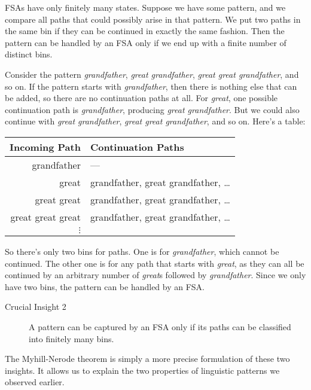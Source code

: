 FSAs have only finitely many states.
Suppose we have some pattern, and we compare all paths that could possibly arise in that pattern.
We put two paths in the same bin if they can be continued in exactly the same fashion.
Then the pattern can be handled by an FSA only if we end up with a finite number of distinct bins.
%
\begin{examplebox}
    Consider the pattern \emph{grandfather}, \emph{great grandfather}, \emph{great great grandfather}, and so on.
    If the pattern starts with \emph{grandfather}, then there is nothing else that can be added, so there are no continuation paths at all.
    For \emph{great}, one possible continuation path is \emph{grandfather}, producing \emph{great grandfather}.
    But we could also continue with \emph{great grandfather}, \emph{great great grandfather}, and so on.
    Here's a table:
    \begin{center}
        \begin{tabular}{rl}
            \toprule
            \textbf{Incoming Path} & \textbf{Continuation Paths}\\
            \midrule
            grandfather & ---\\
            great & grandfather, great grandfather, \ldots\\
            great great & grandfather, great grandfather, \ldots\\
            great great great & grandfather, great grandfather, \ldots\\
            $\vdots$
            \\
            \bottomrule
        \end{tabular}
    \end{center}
    So there's only two bins for paths.
    One is for \emph{grandfather}, which cannot be continued.
    The other one is for any path that starts with \emph{great}, as they can all be continued by an arbitrary number of \emph{great}s followed by \emph{grandfather}.
    Since we only have two bins, the pattern can be handled by an FSA\@.
\end{examplebox}

\begin{description}
    \item[Crucial Insight 2]
    A pattern can be captured by an FSA only if its paths can be classified into finitely many bins.
\end{description}

The Myhill-Nerode theorem is simply a more precise formulation of these two insights.
It allows us to explain the two properties of linguistic patterns we observed earlier.

